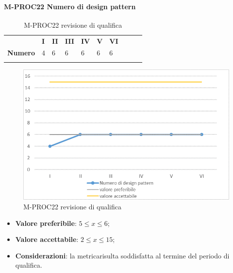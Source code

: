\paragraph{M-PROC22 Numero di design pattern} \mbox{}
\begin{longtable}[H!] {						
		>{}p{50mm}  		
		>{}p{8mm}
		>{}p{8mm}		
		>{}p{8mm}		
		>{}p{8mm}		
		>{}p{8mm}		
		>{}p{8mm}
		>{}p{8mm}
		>{}p{8mm}
		>{}p{8mm}
	}
	\rowcolor{gray!50}
	\textbf{} & \textbf{I} & \textbf{II} & \textbf{III} & \textbf{IV} & \textbf{V} & \textbf{VI} \TBstrut \\ [2mm]
	\textbf{Numero} & 4 & 6 & 6 & 6 & 6 & 6 \TBstrut \\ [2mm]
	\rowcolor{white}
	\caption{M-PROC22 revisione di qualifica}
\end{longtable}
\begin{figure}[H] 	
	\includegraphics[width=\linewidth]{./img/grafici/RQ22.png}	
	\caption{M-PROC22 revisione di qualifica}	
\end{figure}
\begin{itemize}
	\item \textbf{Valore preferibile}: $5\le x \le 6$;
	\item \textbf{Valore accettabile}: $2 \le x \le 15$;
	\item \textbf{Considerazioni}: la metrica\glosp risulta soddisfatta al termine del periodo di qualifica.
\end{itemize}


